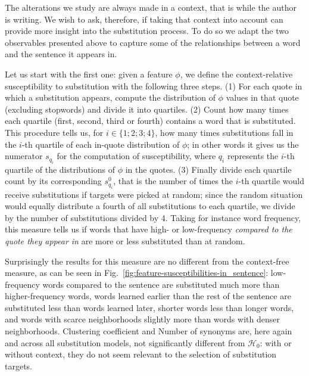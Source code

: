 \begin{new}

The alterations we study are always made in a context, that is while the author is writing.
We wish to ask, therefore, if taking that context into account can provide more insight into the substitution process.
To do so we adapt the two observables presented above to capture some of the relationships between a word and the sentence it appears in.

Let us start with the first one:
given a feature $\phi$, we define the context-relative susceptibility to substitution with the following three steps.
(1) For each quote in which a substitution appears, compute the distribution of $\phi$ values in that quote (excluding stopwords) and divide it into quartiles.
(2) Count how many times each quartile (first, second, third or fourth) contains a word that is substituted.
This procedure tells us, for $i \in \{1; 2; 3; 4\}$, how many times substitutions fall in the $i$-th quartile of each in-quote distribution of $\phi$;
in other words it gives us the numerator $s_{q_i}$ for the computation of susceptibility, where $q_i$ represents the $i$-th quartile of the distributions of $\phi$ in the quotes.
(3) Finally divide each quartile count by its corresponding $s_{q_i}^0$, that is the number of times the $i$-th quartile would receive substitutions if targets were picked at random;
since the random situation would equally distribute a fourth of all substitutions to each quartile, we divide by the number of substitutions divided by 4.
Taking for instance word frequency, this measure tells us if words that have high- or low-frequency \emph{compared to the quote they appear in} are more or less substituted than at random.


Surprisingly the results for this measure are no different from the context-free measure, as can be seen in Fig.~\ref{fig:feature-susceptibilities-in_sentence}:
low-frequency words compared to the sentence are substituted much more than higher-frequency words, words learned earlier than the rest of the sentence are substituted less than words learned later, shorter words less than longer words, and words with scarce neighborhoods slightly more than words with denser neighborhoods.
Clustering coefficient and Number of synonyms are, here again and across all substitution models, not significantly different from $\mathcal{H}_0$:
with or without context, they do not seem relevant to the selection of substitution targets.


\end{new}
